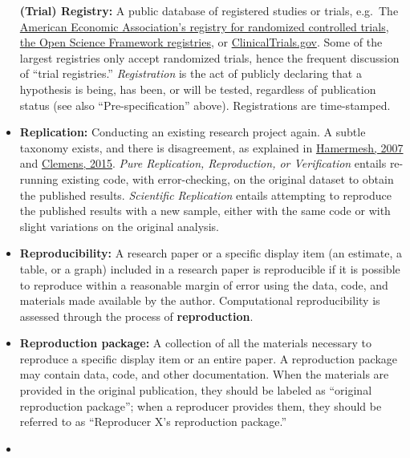 \documentclass[
  openany]{book}
\begin{document}
\begin{itemize}
  \textbf{(Trial) Registry:} A public database of registered studies or trials, e.g.~The \href{https://www.socialscienceregistry.org/}{American Economic Association's registry for randomized controlled trials}, \href{https://osf.io/prereg/}{the Open Science Framework registries}, or \href{https://www.clinicaltrials.gov/}{ClinicalTrials.gov}. Some of the largest registries only accept randomized trials, hence the frequent discussion of ``trial registries.'' \emph{Registration} is the act of publicly declaring that a hypothesis is being, has been, or will be tested, regardless of publication status (see also ``Pre-specification'' above). Registrations are time-stamped.
\item
  \textbf{Replication:} Conducting an existing research project again. A subtle taxonomy exists, and there is disagreement, as explained in \href{https://poseidon01.ssrn.com/delivery.php?ID=730022068104120012124069127117116094125005035067064043105083109027064120011088086109059117052062000025007012029080123125089014014006079063116014095000023071022077006017094093005117096083119073115079022110105075073085121117103030106102080005099007\&EXT=pdf}{Hamermesh, 2007} and \href{https://www.cgdev.org/sites/default/files/CGD-Working-Paper-399-Clemens-Meaning-Failed-Replications.pdf}{Clemens, 2015}. \emph{Pure Replication, Reproduction, or Verification} entails re-running existing code, with error-checking, on the original dataset to obtain the published results. \emph{Scientific Replication} entails attempting to reproduce the published results with a new sample, either with the same code or with slight variations on the original analysis.
\item
  \textbf{Reproducibility:} A research paper or a specific display item (an estimate, a table, or a graph) included in a research paper is reproducible if it is possible to reproduce within a reasonable margin of error using the data, code, and materials made available by the author. Computational reproducibility is assessed through the process of \textbf{reproduction}.
\item
  \textbf{Reproduction package:} A collection of all the materials necessary to reproduce a specific display item or an entire paper. A reproduction package may contain data, code, and other documentation. When the materials are provided in the original publication, they should be labeled as ``original reproduction package''; when a reproducer provides them, they should be referred to as ``Reproducer X's reproduction package.''
\item

\end{itemize}
\end{document}

